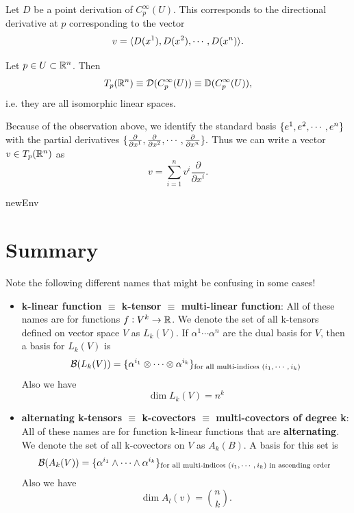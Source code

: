 \begin{observation}
	Let $ D $ be a point derivation of $ C_p^\infty (U) $. This corresponds to the directional derivative at $ p $ corresponding to the vector 
	\[ v = \langle D(x^1), D(x^2), \cdots, D(x^n) \rangle. \]
\end{observation}

\begin{observation}
	Let $ p \in U \subset \mathbb{R}^n $. Then 
	\[ T_p(\mathbb{R}^n) \equiv \mathcal{D}(C_p^\infty(U)) \equiv \mathbb{D}(C_p^\infty(U)), \]
	i.e. they are all isomorphic linear spaces.
\end{observation}

Because of the observation above, we identify the standard basis $ \{e^1, e^2, \cdots, e^n\} $ with the partial derivatives $ \{\frac{\partial}{\partial x^1}, \frac{\partial}{\partial x^2}, \cdots,\frac{\partial}{\partial x^n}\}. $ Thus we can write a vector $ v \in T_p(\mathbb{R}^n) $ as 
\[ v = \sum_{i=1}^{n} v^i \frac{\partial}{\partial x^i}. \]


\begin{theorem}
	newEnv
\end{theorem}


\section{Summary}


\begin{summary}
	Note the following different names that might be confusing in some cases!
	\begin{itemize}
		\item \textbf{k-linear function $ \equiv $ k-tensor $ \equiv $ multi-linear function}: All of these names are for functions $ f: V^k \to \mathbb{R} $. We denote the set of all k-tensors defined on vector space $ V $ as $ L_k(V) $. If $ \alpha^1 \cdots \alpha^n $ are the dual basis for $ V $, then a basis for $ L_k(V) $ is
		\[ \mathcal{B}(L_k(V)) = \{\alpha^{i_1} \otimes \cdots \otimes \alpha^{i_k}\}_\text{for all multi-indices $ (i_1,\cdots,i_k) $} \]
		Also we have
		\[ \dim L_k(V) = n^k \]
		\item \textbf{alternating k-tensors $ \equiv $ k-covectors $ \equiv $ multi-covectors of degree k}: All of these names are for function k-linear functions that are \textbf{alternating}. We denote the set of all k-covectors on $ V $ as $ A_k(B) $. A basis for this set is
		\[ \mathcal{B}(A_k(V)) = \{\alpha^{i_1}\wedge \cdots \wedge \alpha^{i_k}\}_{\text{for all multi-indices $ (i_1,\cdots,i_k) $ in ascending order }} \]
		Also we have
		\[ \dim A_l(v) = \binom{n}{k}. \]
	\end{itemize}
\end{summary}

